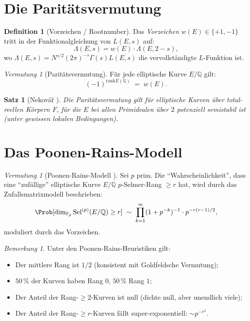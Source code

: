 \documentclass[12pt,a4paper]{amsart}
\newtheorem{satz}[theorem]{Satz}
\theoremstyle{definition}
\newtheorem{definition_de}[theorem]{Definition}
\theoremstyle{remark}
\newtheorem{bemerkung}[theorem]{Bemerkung}
\newtheorem{vermutung}[theorem]{Vermutung}
\newcommand{\Q}{\mathbb{Q}}
\newcommand{\F}{\mathbb{F}}
\newcommand{\Sel}{\mathrm{Sel}}
\newcommand{\rank}{\mathrm{rank}}
\begin{document}
\section{Die Paritätsvermutung}\label{sec:paritaet}

\begin{definition_de}[Vorzeichen / Rootnumber]
  Das \emph{Vorzeichen} $w(E) \in \{+1, -1\}$ tritt in der Funktionalgleichung von
  $L(E,s)$ auf:
  \[
    \Lambda(E,s) = w(E) \cdot \Lambda(E, 2-s),
  \]
  wo $\Lambda(E,s) = N^{s/2}(2\pi)^{-s}\Gamma(s) L(E,s)$ die vervollständigte
  $L$-Funktion ist.
\end{definition_de}

\begin{vermutung}[Paritätsvermutung]\label{verm:paritaet}
  Für jede elliptische Kurve $E/\Q$ gilt:
  \[
    (-1)^{\rank E(\Q)} \;=\; w(E).
  \]
\end{vermutung}

\begin{satz}[Nekovář \cite{Nekovar2009}]
  Die Paritätsvermutung gilt für elliptische Kurven über total-reellen Körpern $F$,
  für die $E$ bei allen Primidealen über $2$ potenziell semistabil ist
  (unter gewissen lokalen Bedingungen).
\end{satz}

\section{Das Poonen-Rains-Modell}\label{sec:poonen_rains}

\begin{vermutung}[Poonen-Rains-Modell \cite{PR2012}]\label{verm:pr}
  Sei $p$ prim. Die ``Wahrscheinlichkeit'', dass eine ``zufällige'' elliptische Kurve
  $E/\Q$ $p$-Selmer-Rang $\geq r$ hat, wird durch das Zufallsmatrixmodell beschrieben:
  \[
    \Prob[\dim_{\F_p} \Sel^{(p)}(E/\Q) \geq r] \;\sim\;
    \prod_{k=1}^\infty (1 + p^{-k})^{-1} \cdot p^{-r(r-1)/2},
  \]
  moduliert durch das Vorzeichen.
\end{vermutung}

\begin{bemerkung}
  Unter den Poonen-Rains-Heuristiken gilt:
  \begin{itemize}
    \item Der mittlere Rang ist $1/2$ (konsistent mit Goldfeldsche Vermutung);
    \item $50\,\%$ der Kurven haben Rang $0$, $50\,\%$ Rang $1$;
    \item Der Anteil der Rang-$\geq 2$-Kurven ist null (dichte null, aber unendlich viele);
    \item Der Anteil der Rang-$\geq r$-Kurven fällt super-exponentiell: $\sim p^{-r^2}$.
  \end{itemize}
\end{bemerkung}
\end{document}

